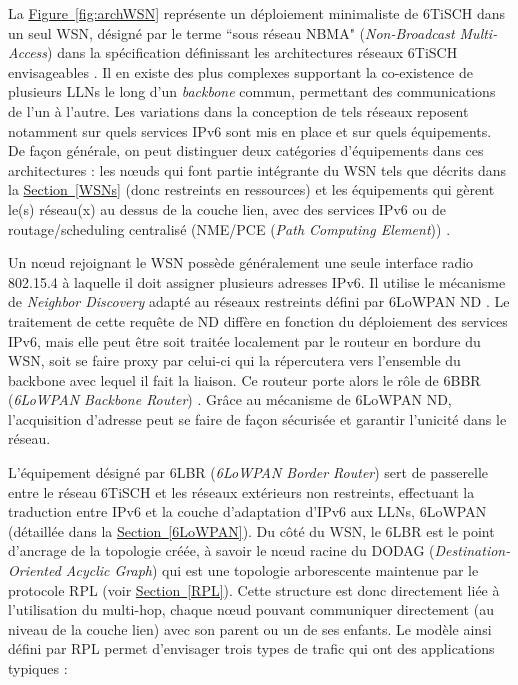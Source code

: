 \documentclass[]{report}
\newcommand{\wordlink}[2]{\hyperref[#2]{#1~\ref{#2}}}
\begin{document}
La \wordlink{Figure}{fig:archWSN} représente un déploiement minimaliste de 6TiSCH dans un seul WSN, désigné par le terme ``sous réseau NBMA" (\textit{Non-Broadcast Multi-Access}) dans la spécification définissant les architectures réseaux 6TiSCH envisageables \cite{ietf-6tisch-architecture-28}. Il en existe des plus complexes supportant la co-existence de plusieurs LLNs le long d'un \textit{backbone} commun, permettant des communications de l'un à l'autre. Les variations dans la conception de tels réseaux reposent notamment sur quels services IPv6 sont mis en place et sur quels équipements. De façon générale, on peut distinguer deux catégories d'équipements dans ces architectures : les nœuds qui font partie intégrante du WSN tels que décrits dans la \wordlink{Section}{WSNs} (donc restreints en ressources) et les équipements qui gèrent le(s) réseau(x) au dessus de la couche lien, avec des services IPv6 ou de routage/scheduling centralisé (NME/PCE (\textit{Path Computing Element})) \cite{ietf-6tisch-architecture-28}.\\

\par Un nœud rejoignant le WSN possède généralement une seule interface radio 802.15.4 à laquelle il doit assigner plusieurs adresses IPv6. Il utilise le mécanisme de \textit{Neighbor Discovery} adapté au réseaux restreints défini par 6LoWPAN ND \cite{rfc6775} \cite{rfc8505}. Le traitement de cette requête de ND diffère en fonction du déploiement des services IPv6, mais elle peut être soit traitée localement par le routeur en bordure du WSN, soit se faire proxy par celui-ci qui la répercutera vers l'ensemble du backbone avec lequel il fait la liaison. Ce routeur porte alors le rôle de 6BBR (\textit{6LoWPAN Backbone Router}) \cite{ietf-6lo-backbone-router-13}. Grâce au mécanisme de 6LoWPAN ND, l'acquisition d'adresse peut se faire de façon sécurisée et garantir l'unicité dans le réseau.

\newpage

\par L'équipement désigné par 6LBR (\textit{6LoWPAN Border Router}) sert de passerelle entre le réseau 6TiSCH et les réseaux extérieurs non restreints, effectuant la traduction entre IPv6 et la couche d'adaptation d'IPv6 aux LLNs, 6LoWPAN (détaillée dans la \wordlink{Section}{6LoWPAN}). Du côté du WSN, le 6LBR est le point d'ancrage de la topologie créée, à savoir le nœud racine du DODAG (\textit{Destination-Oriented Acyclic Graph}) qui est une topologie arborescente maintenue par le protocole RPL (voir \wordlink{Section}{RPL}). Cette structure est donc directement liée à l'utilisation du multi-hop, chaque nœud pouvant communiquer directement (au niveau de la couche lien) avec son parent ou un de ses enfants. Le modèle ainsi défini par RPL permet d'envisager trois types de trafic qui ont des applications typiques \cite{rfc7554} \cite{rfc6550} :\\
\end{document}
